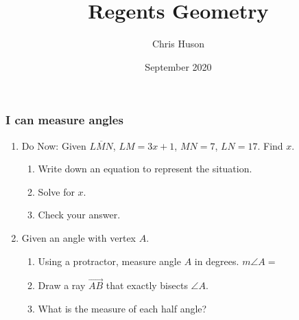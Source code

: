 \documentclass[12pt, twoside]{article}
\title{Regents Geometry}
\author{Chris Huson}
\date{September 2020}
\begin{document}
\subsubsection*{I can measure angles}
\begin{enumerate}
  \item Do Now: Given $\overline{LMN}$, $LM=3x+1$, $MN=7$, $LN=17$. Find ${x}$.\\[0.15in]
\begin{enumerate}
 \item Write down an equation to represent the situation. \vspace{0.5cm}
 \item Solve for $x$. \vspace{1.5cm}
 \item Check your answer. \vspace{1.5cm}
\end{enumerate}

\item Given an angle with vertex $A$.
  \begin{enumerate}[itemsep=0.5cm]
    \item Using a protractor, measure angle $A$ in degrees. $m\angle A =$
    \item Draw a ray $\overrightarrow{AB}$ that exactly bisects $\angle A$.
    \item What is the measure of each half angle?
  \end{enumerate}
  \begin{center}
  \end{center}

\newpage

\end{enumerate}
\end{document}
